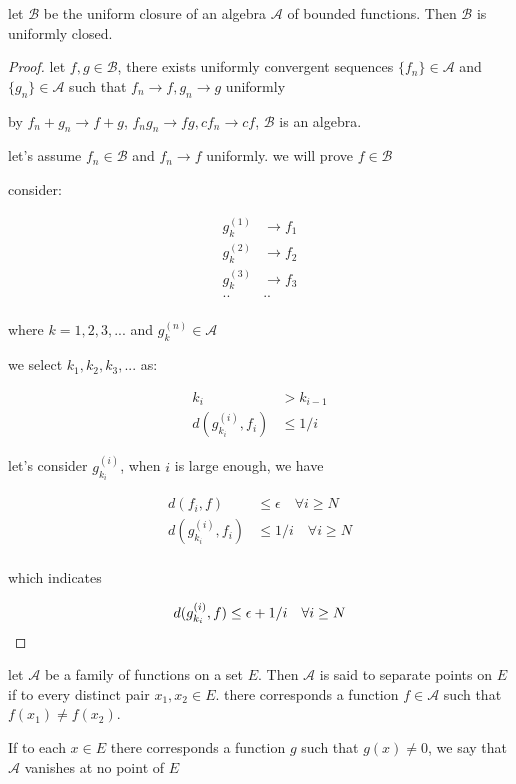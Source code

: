 \begin{thm}
    let $\mathscr{B}$ be the uniform closure of an algebra $\mathscr{A}$
    of bounded functions. Then $\mathscr{B}$ is uniformly closed.
\end{thm}

\begin{proof}
    let $f, g \in \mathscr{B}$, there exists uniformly convergent sequences
    $\{ f_n\} \in \mathscr{A}$ and $\{ g_n\} \in \mathscr{A}$ such that $f_n \to f, g_n \to g$ uniformly

    by $f_n + g_n \to f+g$, $f_ng_n \to fg, cf_n \to cf$, $\mathscr{B}$ is an algebra.

    let's assume $f_n \in \mathscr{B}$ and $f_n \to f$ uniformly. we will prove $f \in \mathscr{B}$

    consider:

    \begin{align*}
        g^{(1)}_k &\to f_1 \\
        g^{(2)}_k &\to f_2 \\
        g^{(3)}_k &\to f_3 \\
        .. & .. \\
    \end{align*}

    where $k=1,2,3,...$ and $g^{(n)}_k \in \mathscr{A}$
    
    we select $k_1, k_2, k_3, ...$ as:

    \begin{align*}
        k_{i} &> k_{i-1} \\
        d(g^{(i)}_{k_i}, f_i) & \le 1/i
    \end{align*}

    let's consider $g^{(i)}_{k_i}$, when $i$ is large enough, we have

    \begin{align*}
        d(f_i, f) & \le \epsilon \quad \forall i \ge N \\
        d(g^{(i)}_{k_i}, f_i) & \le 1/i  \quad \forall i \ge N\\
    \end{align*}

    which indicates

    \[
        d(g^{(i)}_{k_i}, f)  \le \epsilon + 1/i  \quad \forall i \ge N\\
    \]
\end{proof}

\begin{definition}
    let $\mathscr{A}$ be a family of functions on a set $E$. Then $\mathscr{A}$
    is said to separate points on $E$ if to every distinct pair $x_1,x_2 \in E$. 
    there corresponds a function $f \in \mathscr{A}$ such that $f(x_1) \ne f(x_2)$.

    If to each $x \in E$ there corresponds a function $g$ such that $g(x) \ne 0$,
    we say that $\mathscr{A}$ vanishes at no point of $E$
\end{definition}

